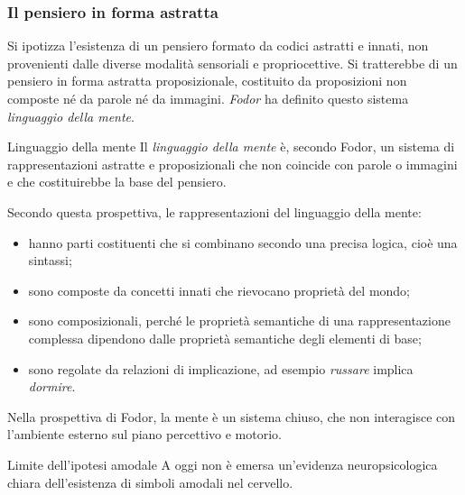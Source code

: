 \documentclass[a4paper]{article}
\begin{document}
\subsubsection{Il pensiero in forma astratta}
Si ipotizza l'esistenza di un pensiero formato da codici astratti e innati, non provenienti dalle diverse modalità sensoriali e propriocettive. Si tratterebbe di un pensiero in forma astratta proposizionale, costituito da proposizioni non composte né da parole né da immagini.
\emph{Fodor} ha definito questo sistema \emph{linguaggio della mente}.
\begin{snippetdefinition}{Linguaggio della mente}
    Il \emph{linguaggio della mente} è, secondo Fodor, un sistema di rappresentazioni astratte e proposizionali che non coincide con parole o immagini e che costituirebbe la base del pensiero.
\end{snippetdefinition}
Secondo questa prospettiva, le rappresentazioni del linguaggio della mente:
\begin{itemize}
    \item hanno parti costituenti che si combinano secondo una precisa logica, cioè una sintassi;
    \item sono composte da concetti innati che rievocano proprietà del mondo;
    \item sono composizionali, perché le proprietà semantiche di una rappresentazione complessa dipendono dalle proprietà semantiche degli elementi di base;
    \item sono regolate da relazioni di implicazione, ad esempio \emph{russare} implica \emph{dormire}.
\end{itemize}
Nella prospettiva di Fodor, la mente è un sistema chiuso, che non interagisce con l'ambiente esterno sul piano percettivo e motorio.
\begin{snippetnote}{Limite dell'ipotesi amodale}
    A oggi non è emersa un'evidenza neuropsicologica chiara dell'esistenza di simboli amodali nel cervello.
\end{snippetnote}
\end{document}
